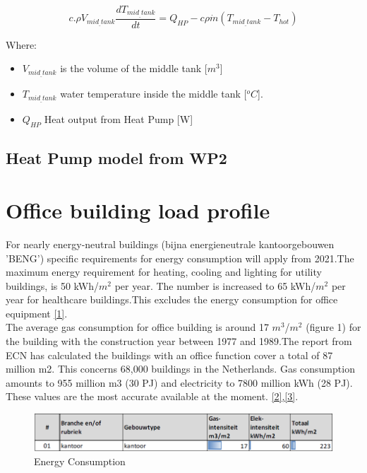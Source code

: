 \documentclass[a4paper,10pt]{article}
\begin{document}

\begin{equation}
c.\rho V_{mid_{\_}tank}\frac{dT_{mid_{\_}tank}}{dt}= Q_{HP} - c\rho \Dot{m}(T_{mid_{\_}tank} - T_{hot})
\end{equation}

Where:
\begin{itemize}
    \item $V_{mid_{\_}tank}$ is the volume of the middle tank [$m^3$]
    \item $T_{mid_{\_}tank}$ water temperature inside the middle tank [$^oC$]. 
    \item $Q_{HP}$ Heat output from Heat Pump [W] 
\end{itemize}
 

\subsection{Heat Pump model from WP2}

\section{Office building load profile}

For nearly energy-neutral buildings (bijna energieneutrale kantoorgebouwen 'BENG') specific requirements for energy consumption will apply from 2021.The maximum energy requirement for heating, cooling and lighting for utility buildings, is 50 kWh/$m^2$ per year. The number is increased to 65 kWh/$m^2$ per year for healthcare buildings.This excludes the energy consumption for office equipment \href{https://www.energievastgoed.nl/benchmarktool/}{[1]}.\\
The average gas consumption for office building is around 17 $m^3$/$m^2$ (figure 1) for the building with the construction year between 1977 and 1989.The report from ECN has calculated the buildings with an office function cover a total of 87 million m2. This concerns 68,000 buildings in the Netherlands. Gas consumption amounts to 955 million m3 (30 PJ) and electricity to 7800 million kWh (28 PJ). These values are the most accurate available at the moment.  
\href{https://www.energievastgoed.nl/2017/02/14/benchmark-energieverbruik-gebouwen/}{[2],[3]}.

\begin{figure}[ht]
\centering
\includegraphics[width=1\columnwidth]{pictures/ECN.png}
\caption[Short title]{Energy Consumption}
\label{fig:ff1}\end{figure}
\end{document}
